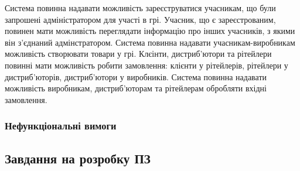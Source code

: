Система повинна надавати  можливість зареєструватися учасникам, що були запрошені адміністратором для участі в грі. Учасник, що є зареєстрованим, повинен мати можливість переглядати інформацію про інших учасників, з якими він з’єднаний адмінстратором. Система повинна надавати учасникам-виробникам можливість створювати товари у грі. Клєінти, дистриб’ютори та рітейлери повинні мати можливість робити замовлення: клієнти у рітейлерів, рітейлери у дистриб’юторів, дистриб’ютори у виробників. Система повинна надавати можливість виробникам, дистриб’юторам та рітейлерам обробляти вхідні замовлення.

        \subsubsection{Нефункціональні вимоги}
        
\subsection{Завдання на розробку ПЗ}
